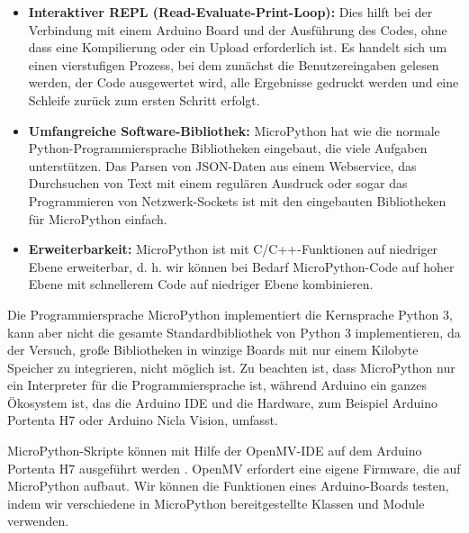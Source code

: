 \begin{itemize}
	\item \textbf{Interaktiver REPL (Read-Evaluate-Print-Loop):} Dies hilft bei der Verbindung mit einem Arduino Board und der Ausführung des Codes, ohne dass eine Kompilierung oder ein Upload erforderlich ist. Es handelt sich um einen vierstufigen Prozess, bei dem zunächst die Benutzereingaben gelesen werden, der Code ausgewertet wird, alle Ergebnisse gedruckt werden und eine Schleife zurück zum ersten Schritt erfolgt.
	\item \textbf{Umfangreiche Software-Bibliothek:} MicroPython hat wie die normale Python-Programmiersprache Bibliotheken eingebaut, die viele Aufgaben unterstützen. Das Parsen von JSON-Daten aus einem Webservice, das Durchsuchen von Text mit einem regulären Ausdruck oder sogar das Programmieren von Netzwerk-Sockets ist mit den eingebauten Bibliotheken für MicroPython einfach.
	\item \textbf{Erweiterbarkeit:} MicroPython ist mit C/C++-Funktionen auf niedriger Ebene erweiterbar, d. h. wir können bei Bedarf MicroPython-Code auf hoher Ebene mit schnellerem Code auf niedriger Ebene kombinieren.
\end{itemize}

Die Programmiersprache MicroPython implementiert die Kernsprache Python 3, kann aber nicht die gesamte Standardbibliothek von Python 3 implementieren, da der Versuch, große Bibliotheken in winzige Boards mit nur einem Kilobyte Speicher zu integrieren, nicht möglich ist. Zu beachten ist, dass MicroPython nur ein Interpreter für die Programmiersprache ist, während Arduino ein ganzes Ökosystem ist, das die Arduino IDE und die Hardware, zum Beispiel Arduino Portenta H7 oder Arduino Nicla Vision, umfasst.

MicroPython-Skripte können mit Hilfe der OpenMV-IDE auf dem Arduino Portenta H7 ausgeführt werden \cite{Romero:2020a}. OpenMV erfordert eine eigene Firmware, die auf MicroPython aufbaut. Wir können die Funktionen eines Arduino-Boards testen, indem wir verschiedene in MicroPython bereitgestellte Klassen und Module verwenden.



